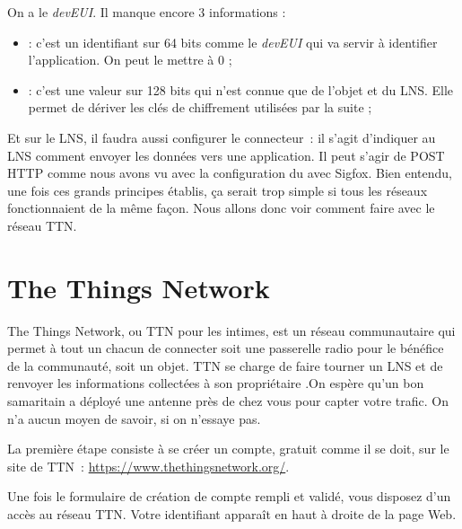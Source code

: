 On a le \textit{devEUI}. Il manque encore 3 informations :

\begin{itemize}
    \item \textit{} : c’est un identifiant sur 64 bits comme le \textit{devEUI} qui va servir à identifier l’application. On peut le mettre à 0 ;
   \item \textit{} : c’est une valeur sur 128 bits qui n’est connue que de l’objet et du LNS. Elle permet de dériver les clés de chiffrement utilisées par la suite ;

\end{itemize}

     \vspace{1em}

Et sur le LNS, il faudra aussi configurer le connecteur~: il s’agit d’indiquer au LNS comment envoyer les données vers une application. Il peut s’agir de POST HTTP comme nous avons vu avec la configuration du \textit{} avec Sigfox. Bien entendu, une fois ces grands principes établis, ça serait trop simple si tous les réseaux fonctionnaient de la même façon. Nous allons donc voir comment faire avec le réseau TTN. 

\section{The Things Network}


\begin{figure}
\end{figure}


The Things Network, ou TTN pour les intimes, est un réseau communautaire qui permet à tout un chacun de connecter soit une passerelle radio pour le bénéfice de la communauté, soit un objet. TTN se charge de faire tourner un LNS et de renvoyer les informations collectées à son propriétaire .On espère qu'un bon samaritain a déployé une antenne près de chez vous pour capter votre trafic. On n'a aucun moyen de savoir, si on n'essaye pas. 

     \vspace{1em}

La première étape consiste à se créer un compte, gratuit comme il se doit, sur le site de TTN~: \url{https://www.thethingsnetwork.org/}.

     \vspace{1em}


Une fois le formulaire de création de compte rempli et validé, vous disposez d’un accès au réseau TTN. 
Votre identifiant apparaît en haut à droite de la page Web. 

